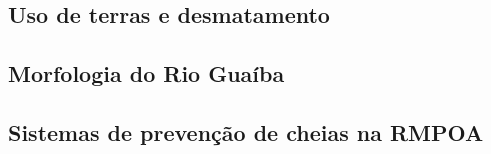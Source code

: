 \lipsum[1-4]

\subsection{Uso de terras e desmatamento}
\lipsum[1-10]

\subsection{Morfologia do Rio Guaíba}
\lipsum[1-8]

\subsection{Sistemas de prevenção de cheias na RMPOA}
\lipsum[1-8]
